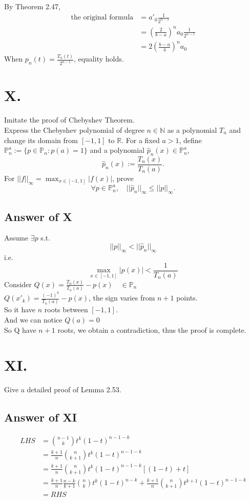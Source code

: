 \documentclass[a4paper]{article}
\begin{document}
By Theorem 2.47,
\begin{align*}
  \text{the original formula}&=a'_0 \frac{1}{2^{n-1}}\\
  &=(\frac{2}{b-a})^n a_0 \frac{1}{2^{n-1}}\\
  &= 2(\frac{b-a}{4})^n a_0
\end{align*}
When $p_n(t)=\frac{T_n(t)}{2^{n-1}}$, equality holds.

\section*{X.}
Imitate the proof of Chebyshev Theorem.\\
Express the Chebyshev polynomial of degree $n \in \mathbb{N}$ as
a polynomial $T_n$ and change its domain from $[-1, 1]$ to
$\mathbb{R}$. For a fixed $a > 1$, define $\mathbb{P}_n^a
 := \{p \in \mathbb{P}_n : p(a) = 1\}$
and a polynomial $\hat{p}_n(x) \in \mathbb{P}_n^a$,
$$\hat{p}_n(x) := \frac{T_n(x)}{T_n(a)}.$$
For $||f||_\infty = \max_{x\in [-1,1]} |f (x)|$, prove
$$\forall p \in \mathbb{P}_n^a, \quad ||\hat{p}_n||_\infty \leq ||p||_\infty.$$

\subsection*{Answer of X}
Assume $\exists p $ s.t. 
$$||p||_\infty < ||\hat{p}_n||_\infty$$
i.e.
$$ \max_{x\in [-1,1]} |p (x)| < \frac{1}{T_n(a)}$$
Consider $Q(x)=\frac{T_n(x)}{T_n(a)}-p(x) \quad \in \mathbb{P}_n $\\
$Q(x'_k)=\frac{(-1)^k}{T_n(a)}-p(x)$, the sign varies from $n+1$ points.\\
So it have $n$ roots between $[-1,1]$.\\
And we can notice $Q(a)=0$\\
So Q have $n+1$ roots, we obtain a contradiction, thus the proof is complete.

\section*{XI.}
Give a detailed proof of Lemma 2.53.

\subsection*{Answer of XI}
\begin{align*}
  LHS&=\binom{n-1}{k}t^k(1-t)^{n-1-k}\\
  &=\frac{k+1}{n}\binom{n}{k+1}t^k(1-t)^{n-1-k}\\
  &=\frac{k+1}{n}\binom{n}{k+1}t^k(1-t)^{n-1-k}[(1-t)+t]\\
  &=\frac{k+1}{n}\frac{n-k}{k+1}\binom{n}{k}t^k(1-t)^{n-k}+\frac{k+1}{n}\binom{n}{k+1}t^{k+1}(1-t)^{n-1-k}\\
  &=RHS
\end{align*}
\end{document}
